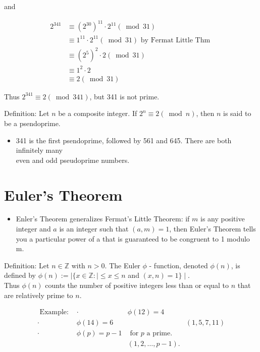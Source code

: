 \documentclass[10pt]{article}
\begin{document}
and

$$
\begin{aligned}
2^{341} & \equiv\left(2^{30}\right)^{11} \cdot 2^{11}(\bmod 31) \\
& \equiv 1^{11} \cdot 2^{11}(\bmod 31) \text { by Fermat Little Thm } \\
& \equiv\left(2^{5}\right)^{2} \cdot 2(\bmod 31) \\
& \equiv 1^{2} \cdot 2 \\
& \equiv 2(\bmod 31)
\end{aligned}
$$

Thus $2^{341} \equiv 2(\bmod 341)$, but 341 is not prime.

Definition: Let $n$ be a composite integer. If $2^{n} \equiv 2(\bmod n)$, then $n$ is said to be a psendoprime.

\begin{itemize}
  \item 341 is the first psendoprime, followed by 561 and 645. There are both infinitely many\\
even and odd pseudoprime numbers.
\end{itemize}

\section*{Euler's Theorem}
\begin{itemize}
  \item Enler's Theorem generalizes Fermat's Little Theorem: if $m$ is any positive integer and $a$ is an integer such that $(a, m)=1$, then Euler's Theorem tells you a particular power of a that is guaranteed to be congruent to 1 modulo m.
\end{itemize}

Definition: Let $n \in \mathbb{Z}$ with $n>0$. The Euler $\phi$ - function, denoted $\phi(n)$, is defined by $\phi(n):=\mid\{x \in \mathbb{Z}: \mid \leqslant x \leq n$ and $(x, n)=1\} \mid$.\\
Thus $\phi(n)$ counts the number of positive integers less than or equal to $n$ that are relatively prime to $n$.

$$
\begin{array}{rlrl}
\text { Example: } & \cdot & \phi(12)=4 & \\
\cdot & \phi(14)=6 & & (1,5,7,11) \\
\cdot & \phi(p)=p-1 & \text { for } p \text { a prime. } \\
& & (1,2, \ldots, p-1) .
\end{array}
$$
\end{document}
